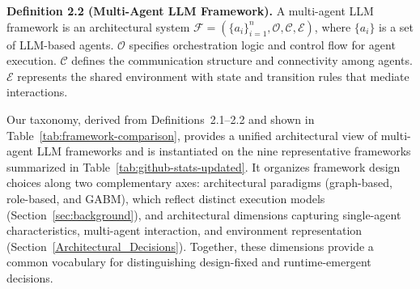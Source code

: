 \noindent\textbf{Definition 2.2 (Multi-Agent LLM Framework).}
A multi-agent LLM framework is an architectural system
$\mathcal{F} = (\{a_i\}_{i=1}^{n}, \mathcal{O}, \mathcal{C}, \mathcal{E})$,
where $\{a_i\}$ is a set of LLM-based agents. $\mathcal{O}$ specifies orchestration logic and control flow for agent execution. $\mathcal{C}$ defines the communication structure and connectivity among agents. $\mathcal{E}$ represents the shared environment with state and transition rules that mediate interactions.\shorten


Our taxonomy, derived from Definitions~2.1--2.2 and shown in Table~\ref{tab:framework-comparison}, provides a unified architectural view of multi-agent LLM frameworks and is instantiated on the nine representative frameworks summarized in Table~\ref{tab:github-stats-updated}. It organizes framework design choices along two complementary axes: architectural paradigms (graph-based, role-based, and GABM), which reflect distinct execution models (Section~\ref{sec:background}), and architectural dimensions capturing single-agent characteristics, multi-agent interaction, and environment representation (Section~\ref{Architectural_Decisions}). Together, these dimensions provide a common vocabulary for distinguishing design-fixed and runtime-emergent decisions.










% 
% 
% 

